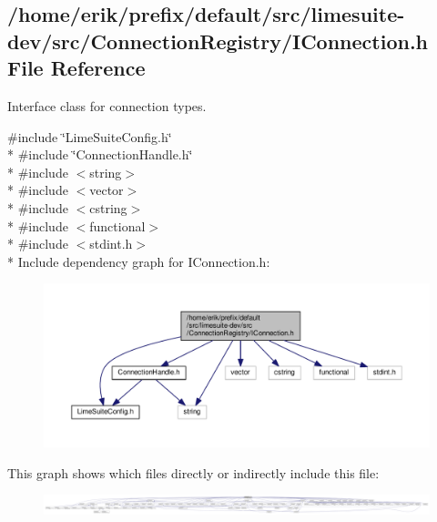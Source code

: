 \subsection{/home/erik/prefix/default/src/limesuite-\/dev/src/\+Connection\+Registry/\+I\+Connection.h File Reference}
\label{IConnection_8h}


Interface class for connection types.  


{\ttfamily \#include \char`\"{}Lime\+Suite\+Config.\+h\char`\"{}}\\*
{\ttfamily \#include \char`\"{}Connection\+Handle.\+h\char`\"{}}\\*
{\ttfamily \#include $<$string$>$}\\*
{\ttfamily \#include $<$vector$>$}\\*
{\ttfamily \#include $<$cstring$>$}\\*
{\ttfamily \#include $<$functional$>$}\\*
{\ttfamily \#include $<$stdint.\+h$>$}\\*
Include dependency graph for I\+Connection.\+h\+:
\nopagebreak
\begin{figure}[H]
\begin{center}
\leavevmode
\includegraphics[width=350pt]{d9/db7/IConnection_8h__incl}
\end{center}
\end{figure}
This graph shows which files directly or indirectly include this file\+:
\nopagebreak
\begin{figure}[H]
\begin{center}
\leavevmode
\includegraphics[width=350pt]{da/d44/IConnection_8h__dep__incl}
\end{center}
\end{figure}
